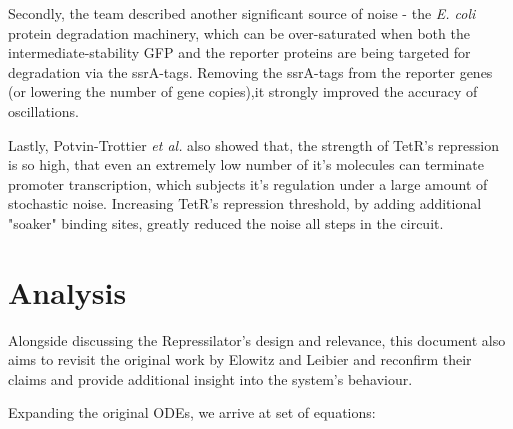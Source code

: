 \documentclass[runningheads,a4paper]{llncs}
\begin{document}
Secondly, the team described another significant source of noise - the \textit{E. coli} protein degradation machinery, which can be over-saturated when both the intermediate-stability GFP and the reporter proteins are being targeted for degradation via the ssrA-tags\cite{Potvin-Trottier2016a}. Removing the ssrA-tags from the reporter genes (or lowering the number of gene copies),\linebreak it strongly improved the accuracy of oscillations\cite{Potvin-Trottier2016a}.

Lastly, Potvin-Trottier \textit{et al.} also showed that, the strength of TetR's repression is so high, that even an extremely low number of it's molecules can terminate promoter transcription, which subjects it's regulation under a large amount of stochastic noise. Increasing TetR's repression threshold, by adding additional "soaker" binding sites, greatly reduced the noise all steps in the circuit\cite{Potvin-Trottier2016a}.

\clearpage
\section*{Analysis}
Alongside discussing the Repressilator's design and relevance, this document also aims to revisit the original work by Elowitz and Leibier\cite{Elowitz2000d} and reconfirm their claims and provide additional insight into the system's behaviour.

Expanding the original ODEs, we arrive at set of equations:
\end{document}
